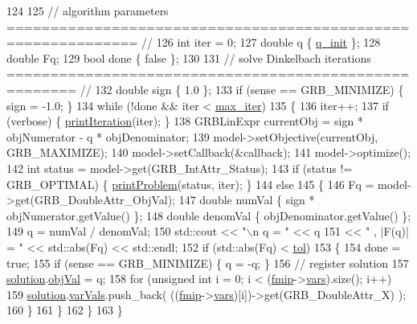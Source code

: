 \begin{DoxyCode}
124 
125   \textcolor{comment}{// algorithm parameters ============================================================= //}
126   \textcolor{keywordtype}{int} iter = 0;
127   \textcolor{keywordtype}{double} q \{ \hyperlink{classgrbfrc_1_1Dinkelbach_aa5ef5cdb3b0b29aee7eeb61c947c2a4d}{q\_init} \};
128   \textcolor{keywordtype}{double} Fq;
129   \textcolor{keywordtype}{bool} done \{ \textcolor{keyword}{false} \};
130 
131   \textcolor{comment}{// solve Dinkelbach iterations ====================================================== //}
132   \textcolor{keywordtype}{double} sign \{ 1.0 \};
133   \textcolor{keywordflow}{if} (sense == GRB\_MINIMIZE) \{ sign = -1.0; \}
134   \textcolor{keywordflow}{while} (!done && iter < \hyperlink{classgrbfrc_1_1Dinkelbach_a732fd0c62a20a624dbd5d9ab95f5d9c7}{max\_iter})
135    \{
136     iter++;
137     \textcolor{keywordflow}{if} (verbose) \{ \hyperlink{classgrbfrc_1_1Dinkelbach_a761608ae16a7e037e2b2e6a0dd096697}{printIteration}(iter); \}
138     GRBLinExpr currentObj = sign * objNumerator - q * objDenominator;
139     model->setObjective(currentObj, GRB\_MAXIMIZE);
140     model->setCallback(&callback);
141     model->optimize();
142     \textcolor{keywordtype}{int} status = model->get(GRB\_IntAttr\_Status);
143     \textcolor{keywordflow}{if} (status != GRB\_OPTIMAL) \{ \hyperlink{classgrbfrc_1_1Dinkelbach_a37136d7a62a3b8b5b480788750fcb5e3}{printProblem}(status, iter); \}
144     \textcolor{keywordflow}{else}
145      \{
146       Fq = model->get(GRB\_DoubleAttr\_ObjVal);
147       \textcolor{keywordtype}{double} numVal \{ sign * objNumerator.getValue() \};
148       \textcolor{keywordtype}{double} denomVal \{ objDenominator.getValue() \};
149       q = numVal / denomVal;
150       std::cout << \textcolor{stringliteral}{"\(\backslash\)n     q = "} << q
151                 << \textcolor{stringliteral}{" ,  |F(q)| = "} << std::abs(Fq) << std::endl;
152       \textcolor{keywordflow}{if} (std::abs(Fq) < \hyperlink{classgrbfrc_1_1Dinkelbach_aa14d02fd3f14975d9ef118b18dfb5d87}{tol})
153        \{
154         done = \textcolor{keyword}{true};
155         \textcolor{keywordflow}{if} (sense == GRB\_MINIMIZE) \{ q = -q; \}
156         \textcolor{comment}{// register solution}
157         \hyperlink{classgrbfrc_1_1Dinkelbach_a2b704289f15a68055ac48167119cc69e}{solution}.\hyperlink{structgrbfrc_1_1FMILPSol_a63fec0e4c5df880215f3de25e8605505}{objVal} = q;
158         \textcolor{keywordflow}{for} (\textcolor{keywordtype}{unsigned} \textcolor{keywordtype}{int} i = 0; i < (\hyperlink{classgrbfrc_1_1Dinkelbach_aa7b46a3cb24f1ec0f278edaa2348729d}{fmip}->\hyperlink{classgrbfrc_1_1FMILP_acbf6866651d8b8b18c094302cf2a4284}{vars}).size(); i++)
159           \hyperlink{classgrbfrc_1_1Dinkelbach_a2b704289f15a68055ac48167119cc69e}{solution}.\hyperlink{structgrbfrc_1_1FMILPSol_a36afbb370bb174c488c46b882c0c9bbf}{varVals}.push\_back( ((\hyperlink{classgrbfrc_1_1Dinkelbach_aa7b46a3cb24f1ec0f278edaa2348729d}{fmip}->\hyperlink{classgrbfrc_1_1FMILP_acbf6866651d8b8b18c094302cf2a4284}{vars})[i])->get(GRB\_DoubleAttr\_X) );
160        \}
161      \}
162    \}
163  \}
\end{DoxyCode}



